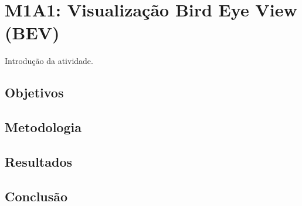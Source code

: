 \section[M1A1]{M1A1: Visualização Bird Eye View (BEV)} \label{M1A1}

Introdução da atividade.

%
%

\subsection{Objetivos}

\subsection{Metodologia}

\subsection{Resultados}

\subsection{Conclusão}
